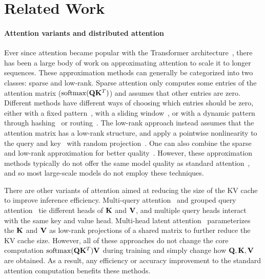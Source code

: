 \section{Related Work}
\label{sec:related_work}

\paragraph{Attention variants and distributed attention}
Ever since attention became popular with the Transformer
architecture~\citep{vaswani2017attention}, there has been a large body of work
on approximating attention to scale it to longer sequences.
These approximation methods can generally be categorized into two classes:
sparse and low-rank.
Sparse attention only computes some entries of the attention matrix ($\mathrm{softmax}(\mathbf{Q}
\mathbf{K}^T)$) and assumes that other entries are zero.
Different methods have different ways of choosing which entries should be zero,
either with a fixed pattern~\citep{child2019generating}, with a sliding
window~\citep{beltagy2020longformer}, or with a dynamic pattern through
hashing~\citep{kitaev2020reformer} or routing~\citep{roy2020efficient}.
The low-rank approach instead assumes that the attention matrix has a low-rank
structure, and apply a pointwise nonlinearity to the query and
key~\citep{katharopoulos2020transformers} with random
projection~\citep{choromanski2021rethinking, peng2021random, xiong2021nystromformer}.
One can also combine the sparse and low-rank approximation for better
quality~\citep{zaheer2020bigbird,scatterbrain}.
However, these approximation methods typically do not offer the same model
quality as standard attention~\citep{tay2020efficient}, and so most large-scale
models do not employ these techniques.

There are other variants of attention aimed at reducing the size of the KV cache
to improve inference efficiency. Multi-query attention~\citep{shazeer2019fast} and grouped query
attention~\citep{ainslie2023gqa} tie different heads of $\mathbf{K}$ and $\mathbf{V}$, and
multiple query heads interact with the same key and value head.
Multi-head latent attention~\citep{deepseekv2} parameterizes the $\mathbf{K}$ and $\mathbf{V}$
as low-rank projections of a shared matrix to further reduce the KV cache size.
However, all of these approaches do not change the core computation
$\mathrm{softmax}(\mathbf{Q} \mathbf{K}^T) \mathbf{V}$ during training and simply change how $\mathbf{Q}, \mathbf{K}, \mathbf{V}$ are
obtained.
As a result, any efficiency or accuracy improvement to the standard attention
computation benefits these methods.

